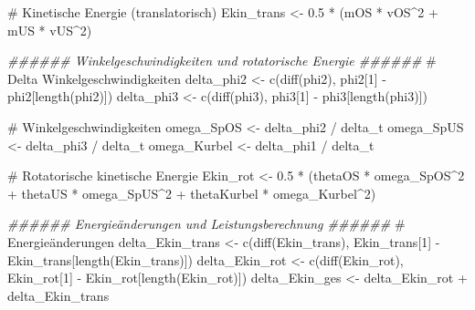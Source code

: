 \documentclass[
  letterpaper,
  DIV=11]{scrartcl}
\newenvironment{Shaded}{\begin{snugshade}}{\end{snugshade}}
\newcommand{\CommentTok}[1]{\textcolor[rgb]{0.37,0.37,0.37}{#1}}
\newcommand{\DecValTok}[1]{\textcolor[rgb]{0.68,0.00,0.00}{#1}}
\newcommand{\DocumentationTok}[1]{\textcolor[rgb]{0.37,0.37,0.37}{\textit{#1}}}
\newcommand{\FloatTok}[1]{\textcolor[rgb]{0.68,0.00,0.00}{#1}}
\newcommand{\FunctionTok}[1]{\textcolor[rgb]{0.28,0.35,0.67}{#1}}
\newcommand{\NormalTok}[1]{\textcolor[rgb]{0.00,0.23,0.31}{#1}}
\newcommand{\OtherTok}[1]{\textcolor[rgb]{0.00,0.23,0.31}{#1}}
\newcommand{\SpecialCharTok}[1]{\textcolor[rgb]{0.37,0.37,0.37}{#1}}
\begin{document}
\begin{Shaded}
\begin{Highlighting}[]
\CommentTok{\# Kinetische Energie (translatorisch)}
\NormalTok{Ekin\_trans }\OtherTok{\textless{}{-}} \FloatTok{0.5} \SpecialCharTok{*}\NormalTok{ (mOS }\SpecialCharTok{*}\NormalTok{ vOS}\SpecialCharTok{\^{}}\DecValTok{2} \SpecialCharTok{+}\NormalTok{ mUS }\SpecialCharTok{*}\NormalTok{ vUS}\SpecialCharTok{\^{}}\DecValTok{2}\NormalTok{)}

\DocumentationTok{\#\#\#\#\#\# Winkelgeschwindigkeiten und rotatorische Energie \#\#\#\#\#\#}
\CommentTok{\# Delta Winkelgeschwindigkeiten}
\NormalTok{delta\_phi2 }\OtherTok{\textless{}{-}} \FunctionTok{c}\NormalTok{(}\FunctionTok{diff}\NormalTok{(phi2), phi2[}\DecValTok{1}\NormalTok{] }\SpecialCharTok{{-}}\NormalTok{ phi2[}\FunctionTok{length}\NormalTok{(phi2)])}
\NormalTok{delta\_phi3 }\OtherTok{\textless{}{-}} \FunctionTok{c}\NormalTok{(}\FunctionTok{diff}\NormalTok{(phi3), phi3[}\DecValTok{1}\NormalTok{] }\SpecialCharTok{{-}}\NormalTok{ phi3[}\FunctionTok{length}\NormalTok{(phi3)])}

\CommentTok{\# Winkelgeschwindigkeiten}
\NormalTok{omega\_SpOS }\OtherTok{\textless{}{-}}\NormalTok{ delta\_phi2 }\SpecialCharTok{/}\NormalTok{ delta\_t}
\NormalTok{omega\_SpUS }\OtherTok{\textless{}{-}}\NormalTok{ delta\_phi3 }\SpecialCharTok{/}\NormalTok{ delta\_t}
\NormalTok{omega\_Kurbel }\OtherTok{\textless{}{-}}\NormalTok{ delta\_phi1 }\SpecialCharTok{/}\NormalTok{ delta\_t}

\CommentTok{\# Rotatorische kinetische Energie}
\NormalTok{Ekin\_rot }\OtherTok{\textless{}{-}} \FloatTok{0.5} \SpecialCharTok{*}\NormalTok{ (thetaOS }\SpecialCharTok{*}\NormalTok{ omega\_SpOS}\SpecialCharTok{\^{}}\DecValTok{2} \SpecialCharTok{+}\NormalTok{ thetaUS }\SpecialCharTok{*}\NormalTok{ omega\_SpUS}\SpecialCharTok{\^{}}\DecValTok{2} \SpecialCharTok{+}\NormalTok{ thetaKurbel }\SpecialCharTok{*}\NormalTok{ omega\_Kurbel}\SpecialCharTok{\^{}}\DecValTok{2}\NormalTok{)}

\DocumentationTok{\#\#\#\#\#\# Energieänderungen und Leistungsberechnung \#\#\#\#\#\#}
\CommentTok{\# Energieänderungen}
\NormalTok{delta\_Ekin\_trans }\OtherTok{\textless{}{-}} \FunctionTok{c}\NormalTok{(}\FunctionTok{diff}\NormalTok{(Ekin\_trans), Ekin\_trans[}\DecValTok{1}\NormalTok{] }\SpecialCharTok{{-}}\NormalTok{ Ekin\_trans[}\FunctionTok{length}\NormalTok{(Ekin\_trans)])}
\NormalTok{delta\_Ekin\_rot }\OtherTok{\textless{}{-}} \FunctionTok{c}\NormalTok{(}\FunctionTok{diff}\NormalTok{(Ekin\_rot), Ekin\_rot[}\DecValTok{1}\NormalTok{] }\SpecialCharTok{{-}}\NormalTok{ Ekin\_rot[}\FunctionTok{length}\NormalTok{(Ekin\_rot)])}
\NormalTok{delta\_Ekin\_ges }\OtherTok{\textless{}{-}}\NormalTok{ delta\_Ekin\_rot }\SpecialCharTok{+}\NormalTok{ delta\_Ekin\_trans}


\end{Highlighting}
\end{Shaded}
\end{document}
